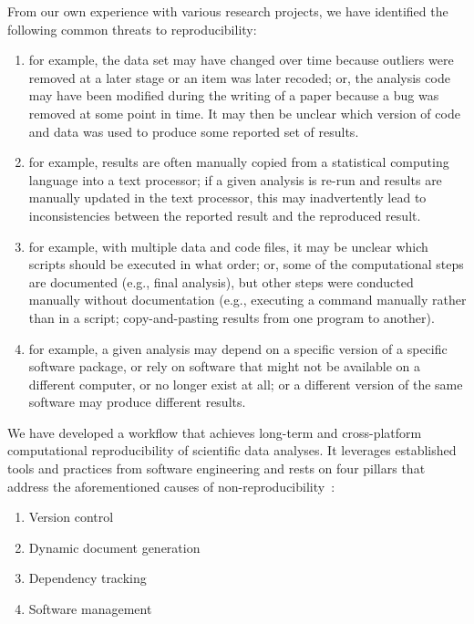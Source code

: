 \documentclass[psych,tutorial,accept,moreauthors,pdftex]{Definitions/mdpi}
\begin{document}
From our own experience with various research projects, we have
identified the following common threats to reproducibility:

\begin{enumerate}
\def\labelenumi{\arabic{enumi}.}
\item
 for
  example, the data set may have changed over time because outliers were
  removed at a later stage or an item was later recoded; or, the
  analysis code may have been modified during the writing of a paper
  because a bug was removed at some point in time. It may then be
  unclear which version of code and data was used to produce some
  reported set of results.
\item
   for example, results are often manually
  copied from a statistical computing language into a text processor; if
  a given analysis is re-run and results are manually updated in the
  text processor, this may inadvertently lead to inconsistencies between
  the reported result and the reproduced result.
\item
   for example,
  with multiple data and code files, it may be unclear which scripts
  should be executed in what order; or, some of the computational steps
  are documented (e.g., final analysis), but other steps were conducted
  manually without documentation (e.g., executing a command manually
  rather than in a script; copy-and-pasting results from one program to
  another).
\item
   for example, a given analysis
  may depend on a specific version of a specific software package, or
  rely on software that might not be available on a different computer,
  or no longer exist at all; or a different version of the same software
  may produce different results.
\end{enumerate}

We have developed a workflow that achieves long-term and cross-platform
computational reproducibility of scientific data analyses. It leverages
established tools and practices from software engineering and rests on
four pillars that address the aforementioned causes of
non-reproducibility~\citep{Peikert2019}:

\begin{enumerate}
\item  Version control
\item  Dynamic document generation
\item  Dependency tracking
\item  Software management
\end{enumerate}
\end{document}
